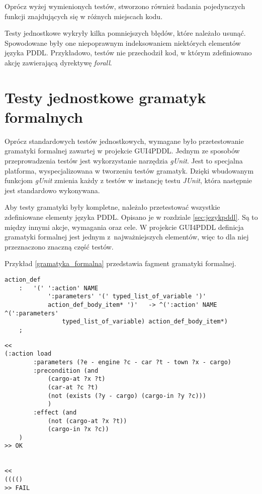Oprócz wyżej wymienionych testów, stworzono również badania pojedynczych funkcji znajdujących się w różnych miejscach kodu.

Testy jednostkowe wykryły kilka pomniejszych błędów, które należało usunąć. Spowodowane były one niepoprawnym indeksowaniem niektórych elementów języka PDDL. Przykładowo, testów nie przechodził kod, w którym zdefiniowano akcję zawierającą dyrektywę \textit{forall}.
\section{Testy jednostkowe gramatyk formalnych}
Oprócz standardowych testów jednostkowych, wymagane było przetestowanie gramatyki formalnej zawartej w projekcie GUI4PDDL. Jednym ze sposobów przeprowadzenia testów jest wykorzystanie narzędzia \textit{gUnit}. Jest to specjalna platforma, wyspecjalizowana w tworzeniu testów gramatyk. Dzięki wbudowanym funkcjom \textit{gUnit} zmienia każdy z testów w instancję testu \textit{JUnit}, która następnie jest standardowo wykonywana.

Aby testy gramatyki były kompletne, należało przetestować wszystkie zdefiniowane elementy języka PDDL. Opisano je w rozdziale \ref{sec:jezykpddl}. Są to między innymi akcje, wymagania oraz cele. W projekcie GUI4PDDL definicja gramatyki formalnej jest jednym z~najważniejszych elementów, więc to dla niej przeznaczono znaczną część testów.

Przykład \ref{gramatyka_formalna} przedstawia fagment gramatyki formalnej.


\begin{Code}
\begin{lstlisting}[language=LISP,frame=single,label={gramatyka_formalna}, caption={Fragment gramatyki formalnej}]
action_def 
	:	'(' ':action' NAME
			':parameters' '(' typed_list_of_variable ')'
			action_def_body_item* ')'   -> ^(':action' NAME ^(':parameters' 
				typed_list_of_variable)	action_def_body_item*) 
	;
\end{lstlisting}
\end{Code}

\begin{Code}
\begin{lstlisting}[language=LISP,frame=single,label={test_gramatyki}, caption={Przykładowe testy dla przykładu \ref{gramatyka_formalna}}]
<<
(:action load
        :parameters (?e - engine ?c - car ?t - town ?x - cargo)
        :precondition (and
            (cargo-at ?x ?t)
            (car-at ?c ?t)
            (not (exists (?y - cargo) (cargo-in ?y ?c)))
            )
        :effect (and
            (not (cargo-at ?x ?t))
            (cargo-in ?x ?c))
    )
>> OK


<<
(((()
>> FAIL
\end{lstlisting}
\end{Code}

